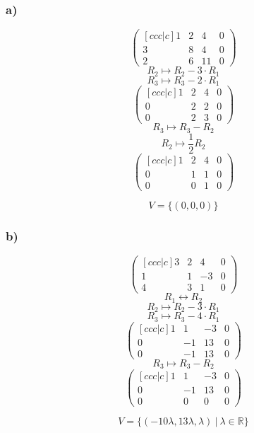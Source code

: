 \documentclass[lineaire_algebra_oplossingen.tex]{subfiles}
\begin{document}
\subsubsection*{a)}
\[
\begin{pmatrix}[ccc|c]
1 & 2 & 4  & 0\\
3 & 8 & 4  & 0\\
2 & 6 & 11 & 0
\end{pmatrix}
\]
\[ R_2 \longmapsto R_2 -3\cdot R_1\]
\[ R_3 \longmapsto R_3 -2\cdot R_1\]
\[
\begin{pmatrix}[ccc|c]
1 & 2 & 4 & 0\\
0 & 2 & 2 & 0\\
0 & 2 & 3 & 0
\end{pmatrix}
\]
\[ R_3 \longmapsto R_3 - R_2\]
\[ R_2 \longmapsto \frac{1}{2} R_2\]
\[
\begin{pmatrix}[ccc|c]
1 & 2 & 4 & 0\\
0 & 1 & 1 & 0\\
0 & 0 & 1 & 0
\end{pmatrix}
\]

\[
V = \{(0,0,0)\}
\]
\subsubsection*{b)}
\[
\begin{pmatrix}[ccc|c]
3 & 2 &  4 & 0\\
1 & 1 & -3 & 0\\
4 & 3 &  1 & 0
\end{pmatrix}
\]
\[R_1 \leftrightarrow R_2\]
\[ R_2 \longmapsto R_2 -3\cdot R_1\]
\[ R_3 \longmapsto R_3 -4\cdot R_1\]
\[
\begin{pmatrix}[ccc|c]
1 &  1 &  -3 & 0\\
0 & -1 &  13 & 0\\
0 & -1 &  13 & 0
\end{pmatrix}
\]
\[ R_3 \longmapsto R_3 - R_2\]
\[
\begin{pmatrix}[ccc|c]
1 &  1 & -3 & 0\\
0 & -1 & 13 & 0\\
0 &  0 &  0 & 0
\end{pmatrix}
\]

\[
V = \{(-10\lambda,13\lambda,\lambda)\ |\ \lambda\in\mathbb{R}\}
\]
\end{document}

